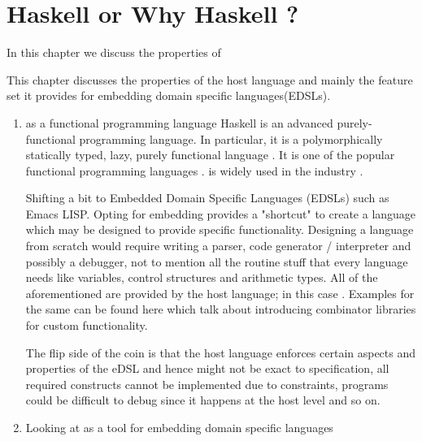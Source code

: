\documentclass[thesis-solanki.tex]{subfiles}
\begin{document}
\chapter{Haskell or Why Haskell ?}\label{chap:hwh}

In this chapter we discuss the properties of  

\par This chapter discusses the properties of the host language  and mainly the feature set it provides for embedding 
domain specific languages(EDSLs).

\begin{enumerate}

\item {} as a functional programming language
Haskell is an advanced purely-functional programming language. In particular, it is a polymorphically statically typed, lazy, purely 
functional language \cite{website:haskellwiki}. It is one of the popular functional programming languages \cite{website:langpop}. 
 is widely used in the industry \cite{website:haskellinindustry}. 

Shifting a bit to Embedded Domain Specific Languages (EDSLs) such as Emacs LISP. Opting for embedding provides a "shortcut" to create a 
language which may be designed to provide specific functionality. Designing a language from scratch would require writing a parser, code 
generator / interpreter and possibly a debugger, not to mention all the routine stuff that every language needs like variables, control 
structures and arithmetic types. All of the aforementioned are provided by the host language; in this case . Examples for 
the same can be found here \cite{jones2001composing, meyer2008eiffel} which talk about introducing combinator libraries for custom 
functionality.

The flip side of the coin is that the host language enforces certain aspects and properties of the eDSL and hence might not be exact to 
specification, all required constructs cannot be implemented due to constraints, programs could be difficult to debug since it happens at
the host level and so on.

\item Looking at  as a tool for embedding domain specific languages\cite{website:paulspontifications}


\end{enumerate}
\end{document}
